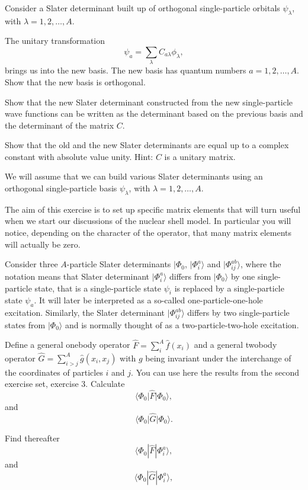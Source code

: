 \begin{prob}
Consider a Slater determinant built up of orthogonal single-particle orbitals $\psi_{\lambda}$, 
with $\lambda = 1,2,\dots,A$.

The unitary transformation
\[
\psi_a  = \sum_{\lambda} C_{a\lambda}\phi_{\lambda},
\]
brings us into the new basis.  
The new basis has quantum numbers $a=1,2,\dots,A$.
Show that the new basis is orthogonal.

Show that the new Slater determinant constructed from the new single-particle wave functions can be
written as the determinant based on the previous basis and the determinant of the matrix $C$.

Show that the old and the new Slater determinants are equal up to a complex constant with absolute value unity.
Hint: $C$ is a unitary matrix. 


We will assume that we can build various Slater determinants using an orthogonal  single-particle basis $\psi_{\lambda}$, 
with $\lambda = 1,2,\dots,A$. 


The aim of this exercise is to set up specific matrix elements that will turn useful when we start our discussions of the nuclear shell model. In particular you will notice, depending on the character of the operator, that many matrix elements will actually be zero.

Consider three $A$-particle  Slater determinants  $|\Phi_0$, $|\Phi_i^a\rangle$ and $|\Phi_{ij}^{ab}\rangle$, where the notation means that 
Slater determinant $|\Phi_i^a\rangle$ differs from $|\Phi_0\rangle$ by one single-particle state, that is a single-particle
state $\psi_i$ is replaced by a single-particle state $\psi_a$. 
It will later be interpreted as a so-called one-particle-one-hole excitation.
Similarly, the Slater determinant $|\Phi_{ij}^{ab}\rangle$
differs by two single-particle states from $|\Phi_0\rangle$ and is normally thought of as a two-particle-two-hole excitation.

Define a general onebody operator $\hat{F} = \sum_{i}^A\hat{f}(x_{i})$ and a general  twobody operator $\hat{G}=\sum_{i>j}^A\hat{g}(x_{i},x_{j})$ with $g$ being invariant under the interchange of the coordinates of particles $i$ and $j$. You can use here the results from the second exercise set, exercise 3.
Calculate
\[
\langle \Phi_0 \vert\hat{F}\vert\Phi_0\rangle,
\]
and
\[
\langle \Phi_0\vert\hat{G}|\Phi_0\rangle.
\]

Find thereafter 
\[
\langle \Phi_0 |\hat{F}|\Phi_i^a\rangle,
\]
and
\[
\langle \Phi_0|\hat{G}|\Phi_i^a\rangle,
\]


\end{prob}
